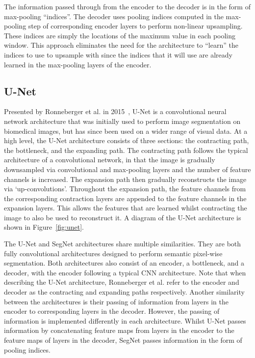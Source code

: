 
The information passed through from the encoder to the decoder is in the form of max-pooling ``indices''. The decoder uses pooling indices computed in the max-pooling step of corresponding encoder layers to perform non-linear upsampling. These indices are simply the locations of the maximum value in each pooling window. This approach eliminates the need for the architecture to ``learn'' the indices to use to upsample with since the indices that it will use are already learned in the max-pooling layers of the encoder.

\subsection{U-Net}

Presented by Ronneberger et al. in 2015~\cite{ronneberger2015u}, U-Net is a convolutional neural network architecture that was initially used to perform image segmentation on biomedical images, but has since been used on a wider range of visual data. At a high level, the U-Net architecture consists of three sections: the contracting path, the bottleneck, and the expanding path. The contracting path follows the typical architecture of a convolutional network, in that the image is gradually downsampled via convolutional and max-pooling layers and the number of feature channels is increased. The expansion path then gradually reconstructs the image via `up-convolutions'. Throughout the expansion path, the feature channels from the corresponding contraction layers are appended to the feature channels in the expansion layers. This allows the features that are learned whilst contracting the image to also be used to reconstruct it. A diagram of the U-Net architecture is shown in Figure~\ref{fig:unet}.

The U-Net and SegNet architectures share multiple similarities. They are both fully convolutional architectures designed to perform semantic pixel-wise segmentation. Both architectures also consist of an encoder, a bottleneck, and a decoder, with the encoder following a typical CNN architecture. Note that when describing the U-Net architecture, Ronneberger et al. refer to the encoder and decoder as the contracting and expanding paths respectively. Another similarity between the architectures is their passing of information from layers in the encoder to corresponding layers in the decoder. However, the passing of information is implemented differently in each architecture. Whilst U-Net passes information by concatenating feature maps from layers in the encoder to the feature maps of layers in the decoder, SegNet passes information in the form of pooling indices.

